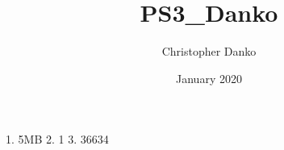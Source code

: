 \documentclass{article}
\title{PS3_Danko}
\author{Christopher Danko }
\date{January 2020}
\begin{document}
\maketitle

\section{}
1. 5MB
2. 1
3. 36634
\end{document}
